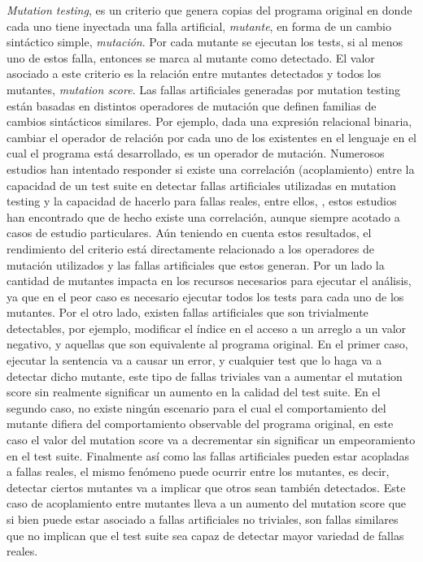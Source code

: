 \emph{Mutation testing}, es un criterio que genera copias del programa original en donde cada uno tiene inyectada una falla artificial, \emph{mutante}, en forma de un cambio sint\'actico simple, \emph{mutaci\'on}. Por cada mutante se ejecutan los tests, si al menos uno de estos falla, entonces se marca al mutante como detectado. El valor asociado a este criterio es la relaci\'on entre mutantes detectados y todos los mutantes, \emph{mutation score}. Las fallas artificiales generadas por mutation testing est\'an basadas en distintos operadores de mutaci\'on que definen familias de cambios sint\'acticos similares. Por ejemplo, dada una expresi\'on relacional binaria, cambiar el operador de relaci\'on por cada uno de los existentes en el lenguaje en el cual el programa est\'a desarrollado, es un operador de mutaci\'on. Numerosos estudios han intentado responder si existe una correlaci\'on (acoplamiento) entre la capacidad de un test suite en detectar fallas artificiales utilizadas en mutation testing y la capacidad de hacerlo para fallas reales, entre ellos, \cite{bibliography.mutation.evaluation.coupling.Offutt89, bibliography.mutation.evaluation.coupling.Offutt92, bibliography.mutation.evaluation.HAndrews05, bibliography.mutation.evaluation.valid-substitute}, estos estudios han encontrado que de hecho existe una correlaci\'on, aunque siempre acotado a casos de estudio particulares. A\'un teniendo en cuenta estos resultados, el rendimiento del criterio est\'a directamente relacionado a los operadores de mutaci\'on utilizados y las fallas artificiales que estos generan. Por un lado la cantidad de mutantes impacta en los recursos necesarios para ejecutar el an\'alisis, ya que en el peor caso es necesario ejecutar todos los tests para cada uno de los mutantes. Por el otro lado, existen fallas artificiales que son trivialmente detectables, por ejemplo, modificar el \'indice en el acceso a un arreglo a un valor negativo, y aquellas que son equivalente al programa original. En el primer caso, ejecutar la sentencia va a causar un error, y cualquier test que lo haga va a detectar dicho mutante, este tipo de fallas triviales van a aumentar el mutation score sin realmente significar un aumento en la calidad del test suite. En el segundo caso, no existe ning\'un escenario para el cual el comportamiento del mutante difiera del comportamiento observable del programa original, en este caso el valor del mutation score va a decrementar sin significar un empeoramiento en el test suite. Finalmente as\'i como las fallas artificiales pueden estar acopladas a fallas reales, el mismo fen\'omeno puede ocurrir entre los mutantes, es decir, detectar ciertos mutantes va a implicar que otros sean tambi\'en detectados. Este caso de acoplamiento entre mutantes lleva a un aumento del mutation score que si bien puede estar asociado a fallas artificiales no triviales, son fallas similares que no implican que el test suite sea capaz de detectar mayor variedad de fallas reales.

